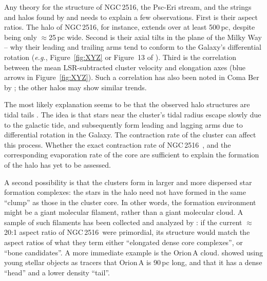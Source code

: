 \documentclass[12pt,twocolumn,tighten]{aastex63}
\newcommand{\cn}{NGC\,2516} %
\begin{document}
Any theory for the structure of \cn, the Psc-Eri stream, and the
strings and halos found by  and
 needs to explain a few observations.  First
is their aspect ratios.  The halo of \cn, for instance, extends over
at least 500\,pc, despite being only $\approx$25\,pc wide.  Second is
their axial tilts in the plane of the Milky Way -- why their leading
and trailing arms tend to conform to the Galaxy's differential
rotation ({\it e.g.}, Figure~\ref{fig:XYZ} or Figure~13 of
).  Third is the correlation between the
mean LSR-subtracted cluster velocity and elongation axes (blue arrows
in Figure~\ref{fig:XYZ}).  Such a correlation has also been noted in
Coma Ber by \citet{tang_comaber_2019}; the other halos may show
similar trends.

The most likely explanation seems to be that the observed halo
structures are tidal tails \citep[{\it
e.g.},][]{chumak_tails_2006,krumholz_star_2019}. The idea is that
stars near the cluster's tidal radius escape slowly due to the
galactic tide, and subsequently form leading and lagging arms due to
differential rotation in the Galaxy.  The contraction rate of the
cluster can affect this process.  Whether the exact contraction rate
of \cn\ \citep{healy_stellar_2020}, and the corresponding evaporation
rate of the core are sufficient to explain the formation of the halo
has yet to be assessed. 

A second possibility is that the clusters form in larger and more
dispersed star formation complexes: the stars in the halo need not
have formed in the same ``clump'' as those in the cluster core.  In
other words, the formation environment might be a
giant molecular filament, rather than a giant molecular cloud.  A
sample of such filaments has been collected and analyzed by
\citet{zucker_physical_2018}: if the current $\approx$20:1 aspect
ratio of \cn\ were primordial, its structure would match the aspect
ratios of what they term either ``elongated dense core complexes'', or
``bone candidates''.  A more immediate example is the Orion\,A cloud.
\citet{grosschedl_3d_2018} showed using young stellar objects as
tracers that Orion\,A is 90\,pc long, and that it has a dense ``head''
and a lower density ``tail''.
\end{document}
